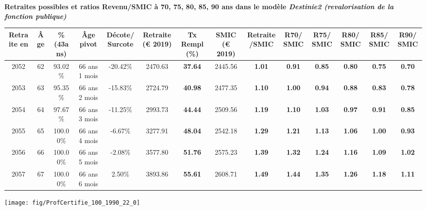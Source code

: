  \vspace{0.1cm} 
{\bf \noindent Retraites possibles et ratios Revenu/SMIC à 70, 75, 80, 85, 90 ans dans le modèle \emph{Destinie2 (revalorisation de la fonction publique)}}  
 
\begin{adjustbox}{max width=\textwidth} 
\begin{tabular}[htb]{|c|c||c|c|c||c|c||c|c||c|c|c|c|c|} 
\hline 
 Retraite en &  Âge &  \%(43ans) &  Âge pivot &  Décote/Surcote &  Retraite (\euro{} 2019) &  Tx Rempl(\%) &  SMIC (\euro{} 2019) &  Retraite/SMIC &  R70/SMIC &  R75/SMIC &  R80/SMIC &  R85/SMIC &  R90/SMIC \\ 
\hline \hline 
 2052 &  62 &  93.02\% &  66 ans 1 mois &  -20.42\% &  2470.63 &  {\bf 37.64} &  2445.56 &  {\bf 1.01} &  {\bf {\color{red} 0.91}} &  {\bf {\color{red} 0.85}} &  {\bf {\color{red} 0.80}} &  {\bf {\color{red} 0.75}} &  {\bf {\color{red} 0.70}} \\ 
\hline 
 2053 &  63 &  95.35\% &  66 ans 2 mois &  -15.83\% &  2724.79 &  {\bf 40.98} &  2477.35 &  {\bf 1.10} &  {\bf 1.00} &  {\bf {\color{red} 0.94}} &  {\bf {\color{red} 0.88}} &  {\bf {\color{red} 0.83}} &  {\bf {\color{red} 0.78}} \\ 
\hline 
 2054 &  64 &  97.67\% &  66 ans 3 mois &  -11.25\% &  2993.73 &  {\bf 44.44} &  2509.56 &  {\bf 1.19} &  {\bf 1.10} &  {\bf 1.03} &  {\bf {\color{red} 0.97}} &  {\bf {\color{red} 0.91}} &  {\bf {\color{red} 0.85}} \\ 
\hline 
 2055 &  65 &  100.00\% &  66 ans 4 mois &  -6.67\% &  3277.91 &  {\bf 48.04} &  2542.18 &  {\bf 1.29} &  {\bf 1.21} &  {\bf 1.13} &  {\bf 1.06} &  {\bf {\color{red} 1.00}} &  {\bf {\color{red} 0.93}} \\ 
\hline 
 2056 &  66 &  100.00\% &  66 ans 5 mois &  -2.08\% &  3577.80 &  {\bf 51.76} &  2575.23 &  {\bf 1.39} &  {\bf 1.32} &  {\bf 1.24} &  {\bf 1.16} &  {\bf 1.09} &  {\bf 1.02} \\ 
\hline 
 2057 &  67 &  100.00\% &  66 ans 6 mois &  2.50\% &  3893.86 &  {\bf 55.61} &  2608.71 &  {\bf 1.49} &  {\bf 1.44} &  {\bf 1.35} &  {\bf 1.26} &  {\bf 1.18} &  {\bf 1.11} \\ 
\hline 
\hline 
\end{tabular} 
\end{adjustbox} 
 
 \vspace{0.1cm} 

 {\hspace{-2.2cm}\texttt{[image: fig/ProfCertifie\_100\_1990\_22\_0]}} 

